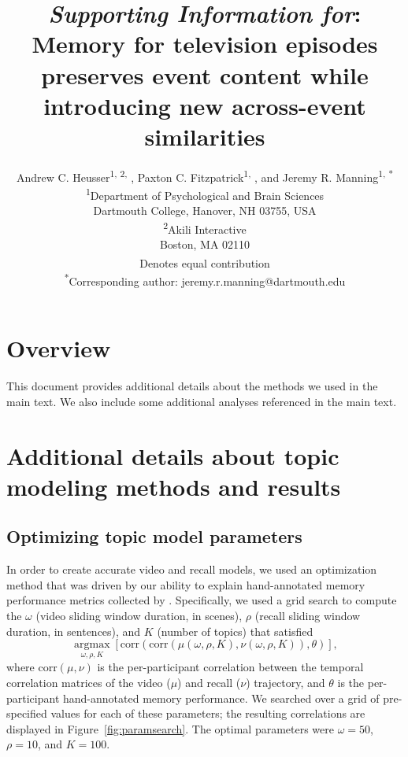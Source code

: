 \documentclass{article}
\title{\textit{Supporting Information for}: Memory for television episodes preserves event content while introducing new across-event similarities}
\author{Andrew C. Heusser\textsuperscript{1, 2, \textdagger}, Paxton C. Fitzpatrick\textsuperscript{1, \textdagger}, and Jeremy R. Manning\textsuperscript{1, *}\\\textsuperscript{1}Department of Psychological and Brain Sciences\\Dartmouth College, Hanover, NH 03755, USA\\\textsuperscript{2}Akili Interactive\\Boston, MA 02110\\\textsuperscript{\textdagger}Denotes equal contribution\\\textsuperscript{*}Corresponding author: jeremy.r.manning@dartmouth.edu}
\newcommand{\argmax}{\mathop{\mathrm{argmax}}\limits}
\begin{document}
\maketitle

\setcounter{equation}{0}
\setcounter{figure}{0}
\setcounter{table}{0}
\setcounter{page}{1}
\setcounter{section}{0}
\makeatletter
\renewcommand{\theequation}{S\arabic{equation}}
\renewcommand{\thefigure}{S\arabic{figure}}
\renewcommand{\bibnumfmt}[1]{[S#1]}
\renewcommand{\citenumfont}[1]{S#1}


\section*{Overview}
This document provides additional details about the methods we used in the main text.  We also include some additional analyses referenced in the main text.

\section*{Additional details about topic modeling methods and results}
\subsection*{Optimizing topic model parameters}
In order to create accurate video and recall models, we used an optimization method that was driven by our ability to explain hand-annotated memory performance metrics collected by \cite{ChenEtal17}.  Specifically, we used a grid search to compute the $\omega$ (video sliding window duration, in scenes), $\rho$ (recall sliding window duration, in sentences), and $K$ (number of topics) that satisfied
\[
\argmax_{\omega, \rho, K} \left[\mathrm{corr}\left(\mathrm{corr}\left(\mu\left(\omega, \rho, K\right), \nu\left(\omega, \rho, K\right)\right), \theta\right)\right],
\]
where $\mathrm{corr}(\mu, \nu)$ is the per-participant correlation between the temporal correlation matrices of the video ($\mu$) and recall ($\nu$) trajectory, and $\theta$ is the per-participant hand-annotated memory performance.  We searched over a grid of pre-specified values for each of these parameters; the resulting correlations are displayed in Figure~\ref{fig:paramsearch}.  The optimal parameters were $\omega = 50$, $\rho = 10$, and $K = 100$.
\end{document}
